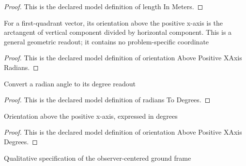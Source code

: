 \begin{proof}
  This is the declared model definition of length In Meters.
\end{proof}
\begin{definition}
  \label{def:physics:phyx-mini-0679:phyxminiproblems-problemphyxmini0679-orientationabovepositivexaxisradians}
  For a first-quadrant vector, its orientation above the positive x-axis is the arctangent of vertical component divided by horizontal component. This is a general geometric readout; it contains no problem-specific coordinate
\end{definition}
\begin{proof}
  This is the declared model definition of orientation Above Positive XAxis Radians.
\end{proof}
\begin{definition}
  \label{def:physics:phyx-mini-0679:phyxminiproblems-problemphyxmini0679-radianstodegrees}
  Convert a radian angle to its degree readout
\end{definition}
\begin{proof}
  This is the declared model definition of radians To Degrees.
\end{proof}
\begin{definition}
  \label{def:physics:phyx-mini-0679:phyxminiproblems-problemphyxmini0679-orientationabovepositivexaxisdegrees}
  Orientation above the positive x-axis, expressed in degrees
\end{definition}
\begin{proof}
  This is the declared model definition of orientation Above Positive XAxis Degrees.
\end{proof}
\begin{definition}
  \label{def:physics:phyx-mini-0679:phyxminiproblems-problemphyxmini0679-groundobserverframe}
  Qualitative specification of the observer-centered ground frame
\end{definition}
